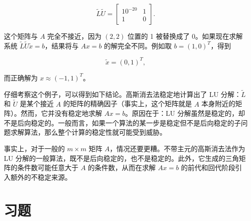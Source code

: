 \documentclass[UTF8,fontset=none,12pt]{ctexart}
\theoremstyle{definition}
\begin{document}
$$
\widetilde L\widetilde U=
\begin{bmatrix}
10^{-20}&1\\
1&0
\end{bmatrix}.
$$

这个矩阵与 $A$ 完全不接近，因为 $(2,2)$ 位置的 1 被替换成了 0。如果现在求解系统 $\widetilde L\widetilde U\widetilde x=b$，结果将与 $Ax=b$ 的解完全不同。例如取 $b=(1,0)^T$，得到

$$
\widetilde x=(0,1)^T,
$$

而正确解为 $x\approx(-1,1)^T$。

仔细考察这个例子，可以得到如下结论。高斯消去法稳定地计算出了 LU 分解：$\widetilde L$ 和 $\widetilde U$ 是某个接近 $A$ 的矩阵的精确因子（事实上，这个矩阵就是 $A$ 本身附近的矩阵）。然而，它并没有稳定地求解 $Ax=b$。原因在于：LU 分解虽然是稳定的，却不是后向稳定的。一般而言，如果一个算法的某一步是稳定但不是后向稳定的子问题求解算法，那么整个计算的稳定性就可能受到威胁。

事实上，对于一般的 $m\times m$ 矩阵 $A$，情况还要更糟。不带主元的高斯消去法作为 LU 分解的一般算法，既不是后向稳定的，也不是稳定的。此外，它生成的三角矩阵的条件数可能任意大于 $A$ 的条件数，从而在求解 $Ax=b$ 的前代和回代阶段引入额外的不稳定来源。

\section*{习题}
\end{document}

